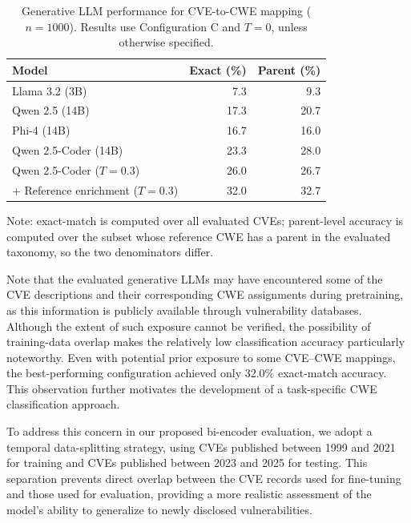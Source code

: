 \documentclass[conference,compsoc]{IEEEtran}
\begin{document}
\begin{table}[t]
\centering
\caption{Generative LLM performance for CVE-to-CWE
mapping ($n=1000$). Results use Configuration C
and $T=0$, unless otherwise specified.}
\label{tab:generative_llm_summary}
\scriptsize
\setlength{\tabcolsep}{3pt}
\begin{tabular}{lrr}
\toprule
\textbf{Model}
& \textbf{Exact (\%)}
& \textbf{Parent (\%)} \\
\midrule
Llama 3.2 (3B)        & 7.3  & 9.3 \\
Qwen 2.5 (14B)        & 17.3 & 20.7 \\
Phi-4 (14B)          & 16.7 & 16.0 \\
Qwen 2.5-Coder (14B)  & 23.3 & 28.0 \\
\midrule
Qwen 2.5-Coder ($T=0.3$)
                       & 26.0 & 26.7 \\
+ Reference enrichment ($T=0.3$)
                       & 32.0 & 32.7 \\
\bottomrule
\end{tabular}
\par\smallskip
\begin{minipage}{\columnwidth}
\footnotesize
Note: exact-match is computed over all evaluated CVEs; parent-level accuracy is computed over the subset whose reference CWE has a parent in the evaluated taxonomy, so the two denominators differ.
\end{minipage}
\end{table}


Note that the evaluated generative
LLMs may have encountered some of the CVE descriptions
and their corresponding CWE assignments during
pretraining, as this information is publicly available
through vulnerability databases. Although the extent
of such exposure cannot be verified, the possibility
of training-data overlap makes the relatively low
classification accuracy particularly noteworthy.
Even with potential prior exposure to some CVE--CWE
mappings, the best-performing configuration achieved
only 32.0\% exact-match accuracy. This observation
further motivates the development of a task-specific
CWE classification approach.

To address this concern in our proposed bi-encoder
evaluation, we adopt a temporal data-splitting
strategy, using CVEs published between 1999 and
2021 for training and CVEs published between 2023
and 2025 for testing. This separation prevents
direct overlap between the CVE records used for
fine-tuning and those used for evaluation, providing
a more realistic assessment of the model's ability
to generalize to newly disclosed vulnerabilities.
\end{document}
